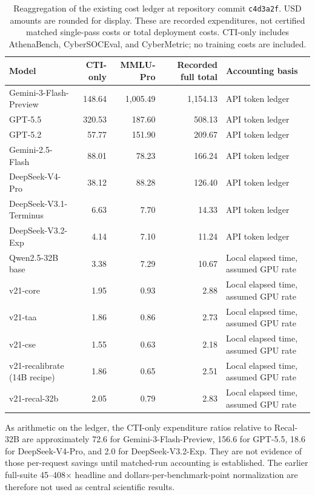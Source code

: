 \documentclass[journal]{IEEEtran}
\newcommand{\repostamp}{\texttt{c4d3a2f}}
\begin{document}
\begin{table}[!t]
\centering\small
\caption{Reaggregation of the existing cost ledger at repository commit \repostamp{}. USD amounts are rounded for display. These are recorded expenditures, not certified matched single-pass costs or total deployment costs. CTI-only includes AthenaBench, CyberSOCEval, and CyberMetric; no training costs are included.}\label{tab:cost}
\begin{tabular}{@{}lrrrl@{}}
\toprule Model & CTI-only & MMLU-Pro & Recorded full total & Accounting basis \\\midrule
Gemini-3-Flash-Preview & 148.64 & 1,005.49 & 1,154.13 & API token ledger \\
GPT-5.5 & 320.53 & 187.60 & 508.13 & API token ledger \\
GPT-5.2 & 57.77 & 151.90 & 209.67 & API token ledger \\
Gemini-2.5-Flash & 88.01 & 78.23 & 166.24 & API token ledger \\
DeepSeek-V4-Pro & 38.12 & 88.28 & 126.40 & API token ledger \\
DeepSeek-V3.1-Terminus & 6.63 & 7.70 & 14.33 & API token ledger \\
DeepSeek-V3.2-Exp & 4.14 & 7.10 & 11.24 & API token ledger \\\midrule
Qwen2.5-32B base & 3.38 & 7.29 & 10.67 & Local elapsed time, assumed GPU rate \\
v21-core & 1.95 & 0.93 & 2.88 & Local elapsed time, assumed GPU rate \\
v21-taa & 1.86 & 0.86 & 2.73 & Local elapsed time, assumed GPU rate \\
v21-cse & 1.55 & 0.63 & 2.18 & Local elapsed time, assumed GPU rate \\
v21-recalibrate (14B recipe) & 1.86 & 0.65 & 2.51 & Local elapsed time, assumed GPU rate \\
v21-recal-32b & 2.05 & 0.79 & 2.83 & Local elapsed time, assumed GPU rate \\\bottomrule
\end{tabular}
\end{table}

As arithmetic on the ledger, the CTI-only expenditure ratios relative to Recal-32B are approximately 72.6 for Gemini-3-Flash-Preview, 156.6 for GPT-5.5, 18.6 for DeepSeek-V4-Pro, and 2.0 for DeepSeek-V3.2-Exp. They are not evidence of those per-request savings until matched-run accounting is established. The earlier full-suite 45--408$\times$ headline and dollars-per-benchmark-point normalization are therefore not used as central scientific results.
\end{document}
